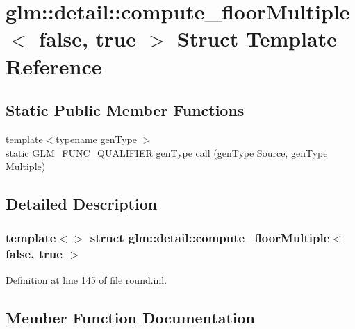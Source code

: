 \hypertarget{structglm_1_1detail_1_1compute__floor_multiple_3_01false_00_01true_01_4}{}\section{glm\+::detail\+::compute\+\_\+floor\+Multiple$<$ false, true $>$ Struct Template Reference}
\label{structglm_1_1detail_1_1compute__floor_multiple_3_01false_00_01true_01_4}
\subsection*{Static Public Member Functions}
\begin{DoxyCompactItemize}
\item 
{\footnotesize template$<$typename gen\+Type $>$ }\\static \mbox{\hyperlink{setup_8hpp_a33fdea6f91c5f834105f7415e2a64407}{G\+L\+M\+\_\+\+F\+U\+N\+C\+\_\+\+Q\+U\+A\+L\+I\+F\+I\+ER}} \mbox{\hyperlink{structglm_1_1detail_1_1gen_type}{gen\+Type}} \mbox{\hyperlink{structglm_1_1detail_1_1compute__floor_multiple_3_01false_00_01true_01_4_a1d2dfa9746c67e805de83b41b6a7a94d}{call}} (\mbox{\hyperlink{structglm_1_1detail_1_1gen_type}{gen\+Type}} Source, \mbox{\hyperlink{structglm_1_1detail_1_1gen_type}{gen\+Type}} Multiple)
\end{DoxyCompactItemize}


\subsection{Detailed Description}
\subsubsection*{template$<$$>$\newline
struct glm\+::detail\+::compute\+\_\+floor\+Multiple$<$ false, true $>$}



Definition at line 145 of file round.\+inl.



\subsection{Member Function Documentation}
\mbox{\label{structglm_1_1detail_1_1compute__floor_multiple_3_01false_00_01true_01_4_a1d2dfa9746c67e805de83b41b6a7a94d}} 
